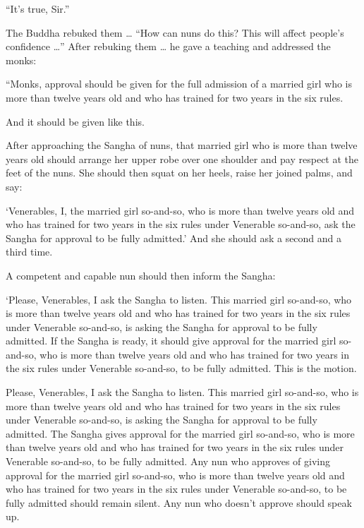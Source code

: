 \documentclass[12pt,openany]{book}%
\begin{document}
“It’s true, Sir.” 

The Buddha rebuked them … “How can nuns do this? This will affect people’s confidence …” After rebuking them … he gave a teaching and addressed the monks: 

“Monks, approval should be given for the full admission of a married girl who is more than twelve years old and who has trained for two years in the six rules. 

And it should be given like this. 

After approaching the Sangha of nuns, that married girl who is more than twelve years old should arrange her upper robe over one shoulder and pay respect at the feet of the nuns. She should then squat on her heels, raise her joined palms, and say: 

‘Venerables, I, the married girl so-and-so, who is more than twelve years old and who has trained for two years in the six rules under Venerable so-and-so, ask the Sangha for approval to be fully admitted.’ And she should ask a second and a third time. 

A competent and capable nun should then inform the Sangha: 

‘Please, Venerables, I ask the Sangha to listen. This married girl so-and-so, who is more than twelve years old and who has trained for two years in the six rules under Venerable so-and-so, is asking the Sangha for approval to be fully admitted. If the Sangha is ready, it should give approval for the married girl so-and-so, who is more than twelve years old and who has trained for two years in the six rules under Venerable so-and-so, to be fully admitted. This is the motion. 

Please, Venerables, I ask the Sangha to listen. This married girl so-and-so, who is more than twelve years old and who has trained for two years in the six rules under Venerable so-and-so, is asking the Sangha for approval to be fully admitted. The Sangha gives approval for the married girl so-and-so, who is more than twelve years old and who has trained for two years in the six rules under Venerable so-and-so, to be fully admitted. Any nun who approves of giving approval for the married girl so-and-so, who is more than twelve years old and who has trained for two years in the six rules under Venerable so-and-so, to be fully admitted should remain silent. Any nun who doesn’t approve should speak up. 
\end{document}
